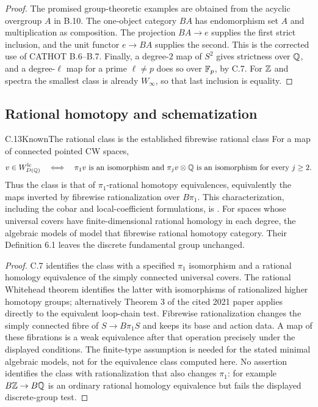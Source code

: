 \begin{proof}
The promised group-theoretic examples are obtained from the acyclic overgroup $A$ in B.10.  The one-object category $BA$ has endomorphism set $A$ and multiplication as composition.  The projection $BA\to e$ supplies the first strict inclusion, and the unit functor $e\to BA$ supplies the second.  This is the corrected use of CATHOT B.6--B.7.  Finally, a degree-$2$ map of $S^2$ gives strictness over $\mathbb Q$, and a degree-$\ell$ map for a prime $\ell\ne p$ does so over $\mathbb F_p$, by C.7.  For $\mathbb Z$ and spectra the smallest class is already $W_\infty$, so that last inclusion is equality.
\end{proof}

\subsection{Rational homotopy and schematization}
\begin{claim}{C.13}{Known}{The rational class is the established fibrewise rational class}
For a map of connected pointed CW spaces,
\[
 v\in W_{D(\mathbb Q)}^{\mathrm{lc}}
 \quad\Longleftrightarrow\quad
 \pi_1v\text{ is an isomorphism and }
 \pi_jv\otimes\mathbb Q\text{ is an isomorphism for every }j\geq2.
\]
Thus the class is that of $\pi_1$-rational homotopy equivalences, equivalently the maps inverted by fibrewise rationalization over $B\pi_1$.  This characterization, including the cobar and local-coefficient formulations, is \citet[Theorem 3]{C_RiveraWierstraZeinalian2021}.  For spaces whose universal covers have finite-dimensional rational homology in each degree, the algebraic models of \citet[Theorems 5.10, 5.11, 6.2, and 6.4]{C_GomezTatoHalperinTanre2000} model that fibrewise rational homotopy category.  Their Definition 6.1 leaves the discrete fundamental group unchanged.
\end{claim}
\begin{proof}
C.7 identifies the class with a specified $\pi_1$ isomorphism and a rational homology equivalence of the simply connected universal covers.  The rational Whitehead theorem identifies the latter with isomorphisms of rationalized higher homotopy groups; alternatively Theorem 3 of the cited 2021 paper applies directly to the equivalent loop-chain test.  Fibrewise rationalization changes the simply connected fibre of $S\to B\pi_1S$ and keeps its base and action data.  A map of these fibrations is a weak equivalence after that operation precisely under the displayed conditions.  The finite-type assumption is needed for the stated minimal algebraic models, not for the equivalence class computed here.  No assertion identifies the class with rationalization that also changes $\pi_1$: for example $B\mathbb Z\to B\mathbb Q$ is an ordinary rational homology equivalence but fails the displayed discrete-group test.
\end{proof}

